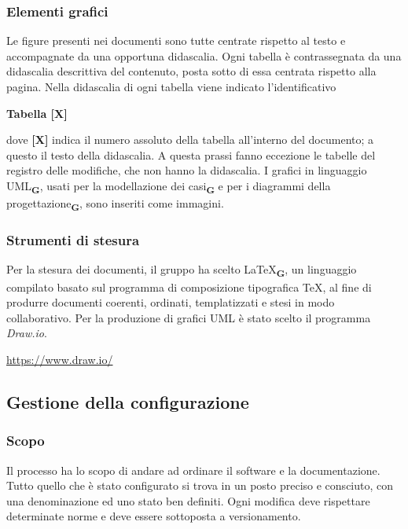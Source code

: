         \subsubsection{Elementi grafici}
            Le figure presenti nei documenti sono tutte centrate rispetto al testo e accompagnate da una opportuna didascalia.
            Ogni tabella è contrassegnata da una didascalia descrittiva del contenuto, posta sotto di essa centrata rispetto alla pagina.  Nella didascalia di ogni tabella viene indicato l’identificativo
            \begin{center}
                \textbf{Tabella [X]}
            \end{center}
            dove \textbf{[X]} indica il numero assoluto della tabella all’interno del documento; a questo il testo della didascalia. A questa prassi fanno eccezione le tabelle del registro delle modifiche, che non hanno la didascalia.
            I grafici in linguaggio UML\textsubscript{\textbf{G}}, usati per la modellazione dei casi\textsubscript{\textbf{G}} e per i diagrammi della progettazione\textsubscript{\textbf{G}}, sono inseriti come immagini.
        \subsubsection{Strumenti di stesura}
            \subsubsubsection{\LaTeX}
            Per la stesura dei documenti, il gruppo ha scelto \LaTeX\textsubscript{\textbf{G}}, un linguaggio compilato basato sul programma di composizione tipografica \TeX, al fine di produrre documenti coerenti, ordinati, templatizzati e stesi in modo collaborativo.
            Per la produzione di grafici UML è stato scelto il programma \textit{Draw.io}.
            \begin{center}
                \href{https://www.draw.io/}{https://www.draw.io/}\\
            \end{center}
    \subsection{Gestione della configurazione}
        \subsubsection{Scopo}
        Il processo ha lo scopo di andare ad ordinare il software e la documentazione. Tutto quello che è stato configurato si trova in un posto preciso e consciuto, con una denominazione ed uno stato ben definiti. Ogni modifica deve rispettare determinate norme e deve essere sottoposta a versionamento.
